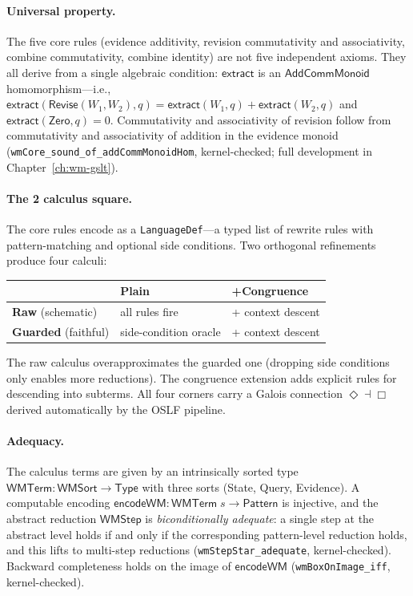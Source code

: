\documentclass[11pt,openany]{report}
\begin{document}
\paragraph{Universal property.}
The five core rules (evidence additivity, revision commutativity and
associativity, combine commutativity, combine identity) are not five
independent axioms.  They all derive from a single algebraic condition:
$\mathsf{extract}$ is an $\mathsf{AddCommMonoid}$ homomorphism---i.e.,
$\mathsf{extract}(\mathsf{Revise}(W_1,W_2), q) =
\mathsf{extract}(W_1, q) + \mathsf{extract}(W_2, q)$ and
$\mathsf{extract}(\mathsf{Zero}, q) = 0$.  Commutativity and associativity
of revision follow from commutativity and associativity of addition in the
evidence monoid (\texttt{wmCore\_sound\_of\_addCommMonoidHom},
kernel-checked; full development in Chapter~\ref{ch:wm-gslt}).

\paragraph{The 2 calculus square.}
The core rules encode as a \texttt{LanguageDef}---a typed list of
rewrite rules with pattern-matching and optional side conditions.  Two
orthogonal refinements produce four calculi:

\begin{center}
\begin{tabular}{lll}
\toprule
& \textbf{Plain} & \textbf{+Congruence} \\
\midrule
\textbf{Raw} (schematic) & all rules fire & + context descent \\
\textbf{Guarded} (faithful) & side-condition oracle & + context descent \\
\bottomrule
\end{tabular}
\end{center}

\noindent
The raw calculus overapproximates the guarded one (dropping side conditions
only enables more reductions).  The congruence extension adds explicit rules
for descending into subterms.  All four corners carry a Galois connection
$\Diamond \dashv \Box$ derived automatically by the OSLF pipeline.

\paragraph{Adequacy.}
The calculus terms are given by an intrinsically sorted type
$\mathsf{WMTerm} : \mathsf{WMSort} \to \mathsf{Type}$ with three sorts
(State, Query, Evidence).  A computable encoding
$\mathsf{encodeWM} : \mathsf{WMTerm}\;s \to \mathsf{Pattern}$ is
injective, and the abstract reduction $\mathsf{WMStep}$ is
\emph{biconditionally adequate}: a single step at the abstract level
holds if and only if the corresponding pattern-level reduction holds, and
this lifts to multi-step reductions
(\texttt{wmStepStar\_adequate}, kernel-checked).
Backward completeness holds on the image of $\mathsf{encodeWM}$
(\texttt{wmBoxOnImage\_iff}, kernel-checked).
\end{document}
